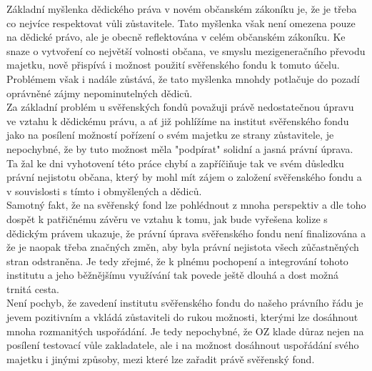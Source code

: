 \documentclass{article}
\begin{document}

Základní myšlenka dědického práva v novém občanském zákoníku je, že je třeba co nejvíce respektovat vůli zůstavitele. Tato myšlenka však není omezena pouze na dědické právo, ale je obecně reflektována v celém občanském zákoníku. Ke snaze o vytvoření co největší volnosti občana, ve smyslu mezigeneračního převodu majetku, nově přispívá i možnost použití svěřenského fondu k tomuto účelu. Problémem však i nadále zůstává, že tato myšlenka mnohdy potlačuje do pozadí oprávněné zájmy nepominutelných dědiců.\\

Za základní problém u svěřenských fondů považuji právě nedostatečnou úpravu ve vztahu k dědickému právu, a ať již pohlížíme na institut svěřenského fondu jako na posílení možností pořízení o svém majetku ze strany zůstavitele, je nepochybné, že by tuto možnost měla "podpírat" solidní a jasná právní úprava. Ta žal ke dni vyhotovení této práce chybí a zapříčiňuje tak ve svém důsledku právní nejistotu občana, který by mohl mít zájem o založení svěřenského fondu a v souvislosti s tímto i obmyšlených a dědiců.\\

Samotný fakt, že na svěřenský fond lze pohlédnout z mnoha perspektiv a dle toho dospět k patřičnému závěru ve vztahu k tomu, jak bude vyřešena kolize s dědickým právem ukazuje, že právní úprava svěřenského fondu není finalizována a že je naopak třeba značných změn, aby byla právní nejistota všech zůčastněných stran odstraněna. Je tedy zřejmé, že k plnému pochopení a integrování tohoto institutu a jeho běžnějšímu využívání tak povede ještě dlouhá a dost možná trnitá cesta.\\

Není pochyb, že zavedení institutu svěřenského fondu do našeho právního řádu je jevem pozitivním a vkládá zůstaviteli do rukou možnosti, kterými lze dosáhnout mnoha rozmanitých uspořádání. Je tedy nepochybné, že OZ klade důraz nejen na posílení testovací vůle zakladatele, ale i na možnost dosáhnout uspořádání svého majetku i jinými způsoby, mezi které lze zařadit právě svěřenský fond.\\
\end{document}
